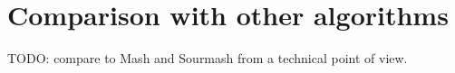 \section{Comparison with other algorithms}

TODO: compare to Mash \cite{mash} and Sourmash \cite{sourmash} from a technical point of view.\\